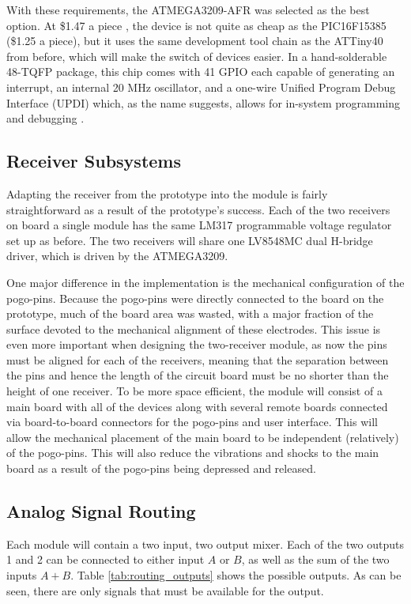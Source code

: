 \documentclass{article}
\begin{document}
	With these requirements, the ATMEGA3209-AFR was selected as the best option.  At \$1.47 a piece \cite{digikey}, the device is not quite as cheap as the PIC16F15385 (\$1.25 a piece), but it uses the same development tool chain as the ATTiny40 from before, which will make the switch of devices easier.  In a hand-solderable 48-TQFP package, this chip comes with 41 GPIO each capable of generating an interrupt, an internal 20 MHz oscillator, and a one-wire Unified Program Debug Interface (UPDI) which, as the name suggests, allows for in-system programming and debugging \cite{ATMEGA3209_datasheet}.

	\subsection{Receiver Subsystems}

	Adapting the receiver from the prototype into the module is fairly straightforward as a result of the prototype's success.  Each of the two receivers on board a single module has the same LM317 programmable voltage regulator set up as before.  The two receivers will share one LV8548MC dual H-bridge driver, which is driven by the ATMEGA3209.

	One major difference in the implementation is the mechanical configuration of the pogo-pins.  Because the pogo-pins were directly connected to the board on the prototype, much of the board area was wasted, with a major fraction of the surface devoted to the mechanical alignment of these electrodes.  This issue is even more important when designing the two-receiver module, as now the pins must be aligned for each of the receivers, meaning that the separation between the pins and hence the length of the circuit board must be no shorter than the height of one receiver.  To be more space efficient, the module will consist of a main board with all of the devices along with several remote boards connected via board-to-board connectors for the pogo-pins and user interface.  This will allow the mechanical placement of the main board to be independent (relatively) of the pogo-pins.  This will also reduce the vibrations and shocks to the main board as a result of the pogo-pins being depressed and released.

	\subsection{Analog Signal Routing}

	Each module will contain a two input, two output mixer.  Each of the two outputs 1 and 2 can be connected to either input $A$ or $B$, as well as the sum of the two inputs $A + B$.  Table \ref{tab:routing_outputs} shows the possible outputs.  As can be seen, there are only signals that must be available for the output.
\end{document}
